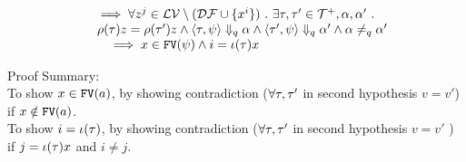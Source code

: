 \begin{lem}
\begin{itemize}
\[\begin{array}{l}
		\\ \quad
		\implies 
		\forall z^j \in \mathcal{LV}  \setminus (\mathcal{DF} \cup \{x^i\} ) ~.~  
		 \exists \mathtt{\tau}, \mathtt{\tau}' \in \mathcal{T}^{+}, \alpha, \alpha'~.~  
		 \\ \quad
		 \rho(\mathtt{\tau}) z = \rho(\mathtt{\tau}') z \land 
		\langle \mathtt{\tau}, \psi \rangle \Downarrow_q \alpha \land \langle \mathtt{\tau}', \psi \rangle \Downarrow_q \alpha' \land \alpha \neq_{q} \alpha'
		\\ \qquad
		\implies x \in \mathtt{FV}(\psi) \land i = \iota(\mathtt{\tau}) x
		\end{array}
	\]
	\end{itemize}
	\end{lem}
Proof Summary: 
\\
To show $x \in \mathtt{FV}(a)$, by showing contradiction ($\forall \mathtt{\tau}, \mathtt{\tau}'$ in second hypothesis  $v = v'$)
 if $x \notin \mathtt{FV}(a)$.
 \\
To show $i = \iota(\mathtt{\tau})$, by showing contradiction ($\forall \mathtt{\tau}, \mathtt{\tau}'$ in second hypothesis  $v = v'$ ) 
if $j = \iota(\mathtt{\tau}) x$ and $i \neq j$.
